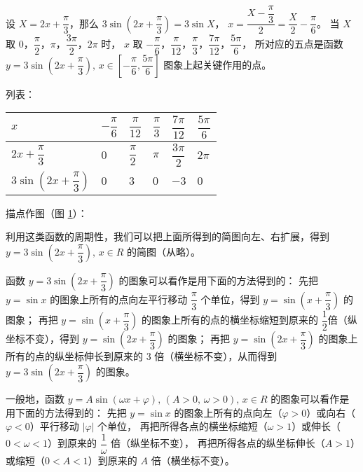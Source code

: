 设 $X = 2x + \dfrac \pi 3$，那么 $3\sin(2x + \dfrac \pi 3) = 3\sin X$，
$x = \dfrac{X - \dfrac \pi 3}{2} = \dfrac X 2 - \dfrac \pi 6$。
当 $X$ 取 $0$，$\dfrac \pi 2$，$\pi$，$\dfrac{3\pi}{2}$，$2\pi$ 时，
$x$ 取 $-\dfrac \pi 6$，$\dfrac{\pi}{12}$，$\dfrac{\pi}{3}$，$\dfrac{7\pi}{12}$，$\dfrac{5\pi}{6}$，
所对应的五点是函数 $y = 3\sin \left( 2x + \dfrac \pi 3 \right), \, x \in \left[ -\dfrac \pi 6, \dfrac{5\pi}{6} \right]$
图象上起关键作用的点。

列表：

\begin{table}[H]
\renewcommand\arraystretch{2}
\begin{tabular}{|w{c}{8em}|*{5}{w{c}{3em}|}}
    \hline
    $x$ & $-\dfrac \pi 6$ & $\dfrac{\pi}{12}$ & $\dfrac{\pi}{3}$ & $\dfrac{7\pi}{12}$ & $\dfrac{5\pi}{6}$ \\ \hline
    $2x + \dfrac \pi 3$ & $0$ & $\dfrac \pi 2$ & $\pi$ & $\dfrac{3\pi}{2}$ & $2\pi$ \\ \hline
    $3\sin \left( 2x + \dfrac \pi 3 \right)$ & $0$ & $3$ & $0$ & $-3$ & $0$ \\ \hline
\end{tabular}
\end{table}

描点作图（图 \ref{fig:2-26}）：

\begin{figure}[htbp]
    \centering
    
    \caption{}\label{fig:2-26}
\end{figure}


利用这类函数的周期性，我们可以把上面所得到的简图向左、右扩展，得到
$y = 3\sin \left( 2x + \dfrac \pi 3 \right), \, x \in R$ 的简图（从略）。

函数 $y = 3\sin \left( 2x + \dfrac \pi 3 \right)$ 的图象可以看作是用下面的方法得到的：
先把 $y = \sin x$ 的图象上所有的点向左平行移动 $\dfrac \pi 3$ 个单位，得到 $y = \sin \left( x + \dfrac \pi 3 \right)$ 的图象；
再把 $y = \sin \left( x + \dfrac \pi 3 \right)$ 的图象上所有的点的横坐标缩短到原来的 $\dfrac 1 2$倍（纵坐标不变），得到 $y = \sin \left( 2x + \dfrac \pi 3 \right)$ 的图象；
再把 $y = \sin \left( 2x + \dfrac \pi 3 \right)$ 的图象上所有的点的纵坐标伸长到原来的 $3$ 倍（横坐标不变），从而得到 $y = 3\sin \left( 2x + \dfrac \pi 3 \right)$ 的图象。
\vspace{0.5em}

一般地，函数 $y = A \sin(\omega x + \varphi), \, (A > 0, \, \omega > 0), \, x \in R$
的图象可以看作是用下面的方法得到的：
先把 $y = \sin x$ 的图象上所有的点向左（$\varphi > 0$）或向右（$\varphi < 0$）平行移动 $|\varphi|$ 个单位，
\vspace{0.5em} 再把所得各点的横坐标缩短（$\omega > 1$）或伸长（$0 < \omega < 1$）到原来的 $\dfrac 1 \omega$ 倍（纵坐标不变），
\vspace{0.5em} 再把所得各点的纵坐标伸长（$A > 1$）或缩短（$0 < A < 1$）到原来的 $A$ 倍（横坐标不变）。

